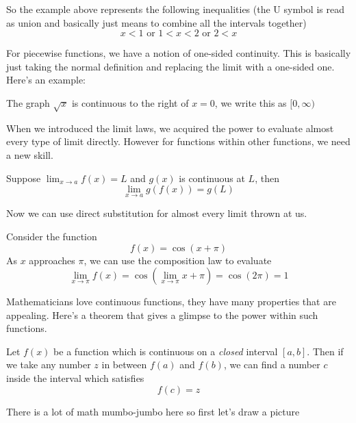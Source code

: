 So the example above represents the following inequalities (the U symbol is read as union and basically just means to combine all the intervals together)
\[ x < 1 \text { or } 1 < x < 2 \text{ or } 2 < x \]

For piecewise functions, we have a notion of one-sided continuity. This is basically just taking the normal definition and replacing the limit with a one-sided one. Here's an example:

\begin{example}
	The graph $\sqrt{x}$ is continuous to the right of $x = 0$, we write this as $[0, \infty)$ 
\end{example}

When we introduced the limit laws, we acquired the power to evaluate almost every type of limit directly. However for functions within other functions, we need a new skill. 

\begin{theorem}
 	Suppose $\lim_{x \to a} f(x) = L$ and $g(x)$ is continuous at $L$, then
 	\[ \lim_{x \to a} g(f(x)) = g(L) \]
\end{theorem} 

Now we can use direct substitution for almost every limit thrown at us. 

\begin{example}
	Consider the function
	\[ f(x) = \cos(x + \pi) \]
	As $x$ approaches $\pi$, we can use the composition law to evaluate
	\[ \lim_{x \to \pi} f(x) = \cos(\lim_{x \to \pi} x + \pi) = \cos(2\pi) = 1 \]
\end{example}

\newpage 
Mathematicians love continuous functions, they have many properties that are appealing. Here's a theorem that gives a glimpse to the power within such functions.

\begin{theorem}
	Let $f(x)$ be a function which is continuous on a \emph{closed} interval $[a,b]$. Then if we take any number $z$ in between $f(a)$ and $f(b)$, we can find a number $c$ inside the interval which satisfies
	\[ f(c) = z \]
\end{theorem}

There is a lot of math mumbo-jumbo here so first let's draw a picture

